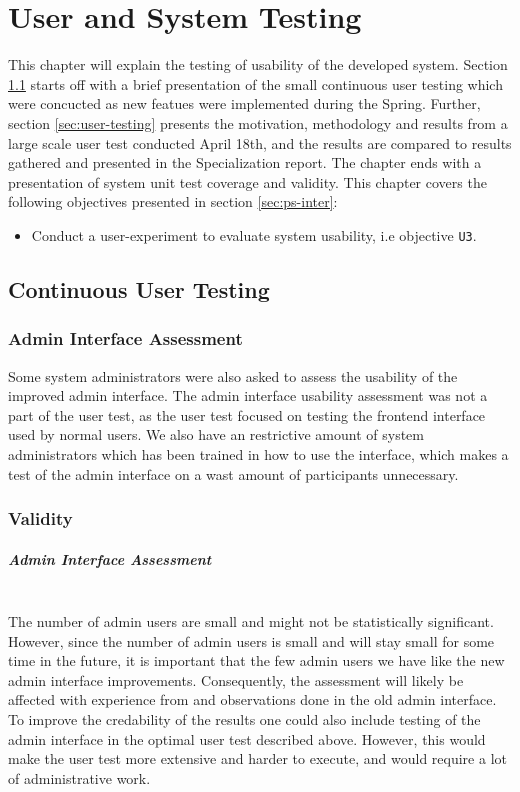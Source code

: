 \chapter{User and System Testing}
This chapter will explain the testing of usability of the developed system. Section \ref{sec:cont-user-testing} starts off with a brief presentation of the small continuous user testing which were concucted as new featues were implemented during the Spring. Further, section \ref{sec:user-testing} presents the motivation, methodology and results from a large scale user test conducted April 18th, and the results are compared to results gathered and presented in the Specialization report. The chapter ends with a presentation of system unit test coverage and validity. This chapter covers the following objectives presented in section \ref{sec:ps-inter}:
\begin{itemize}
  \item Conduct a user-experiment to evaluate system usability, i.e objective \texttt{U3}.
\end{itemize}

\section{Continuous User Testing}
\label{sec:cont-user-testing}

\subsection{Admin Interface Assessment}
Some system administrators were also asked to assess the usability of the improved admin interface. The admin interface usability assessment was not a part of the user test, as the user test focused on testing the frontend interface used by normal users. We also have an restrictive amount of system administrators which has been trained in how to use the interface, which makes a test of the admin interface on a wast amount of participants unnecessary.


\subsection{Validity}
\paragraph*{Admin Interface Assessment} \hfill \\
The number of admin users are small and might not be statistically significant. However, since the number of admin users is small and will stay small for some time in the future, it is important that the few admin users we have like the new admin interface improvements. Consequently, the assessment will likely be affected with experience from and observations done in the old admin interface. To improve the credability of the results one could also include testing of the admin interface in the optimal user test described above. However, this would make the user test more extensive and harder to execute, and would require a lot of administrative work.

